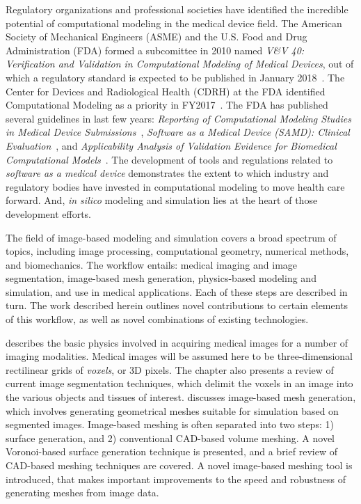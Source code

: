 Regulatory organizations and professional societies have identified the incredible potential of computational modeling in the medical device field. The American Society of Mechanical Engineers (ASME) and the U.S. Food and Drug Administration (FDA) formed a subcomittee in 2010 named \textit{V\&V 40: Verification and Validation in Computational Modeling of Medical Devices}, out of which a regulatory standard is expected to be published in January 2018~\cite{committee}. The Center for Devices and Radiological Health (CDRH) at the FDA identified Computational Modeling as a priority in FY2017~\cite{Morrison2017}. The FDA has published several guidelines in last few years: \textit{Reporting of Computational Modeling Studies in Medical Device Submissions}~\cite{fda1_2016}, \textit{Software as a Medical Device (SAMD): Clinical Evaluation}~\cite{fda1_2016}, and \textit{Applicability Analysis of Validation Evidence for Biomedical Computational Models}~\cite{pathmanathan_2017}. The development of tools and regulations related to \textit{software as a medical device} demonstrates the extent to which industry and regulatory bodies have invested in computational modeling to move health care forward. And, \textit{in silico} modeling and simulation lies at the heart of those development efforts.


The field of image-based modeling and simulation covers a broad spectrum of topics, including image processing, computational geometry, numerical methods, and biomechanics. The workflow entails: medical imaging and image segmentation, image-based mesh generation, physics-based modeling and simulation, and use in medical applications. Each of these steps are described in turn. The work described herein outlines novel contributions to certain elements of this workflow, as well as novel combinations of existing technologies.

 describes the basic physics involved in acquiring medical images for a number of imaging modalities. Medical images will be assumed here to be three-dimensional rectilinear grids of \textit{voxels}, or 3D pixels. The chapter also presents a review of current image segmentation techniques, which delimit the voxels in an image into the various objects and tissues of interest.  discusses image-based mesh generation, which involves generating geometrical meshes suitable for simulation based on segmented images. Image-based meshing is often separated into two steps: 1) surface generation,  and 2) conventional CAD-based volume meshing. A novel Voronoi-based surface generation technique is presented, and a brief review of CAD-based meshing techniques are covered. A novel image-based meshing tool is introduced, that makes important improvements to the speed and robustness of generating meshes from image data.

